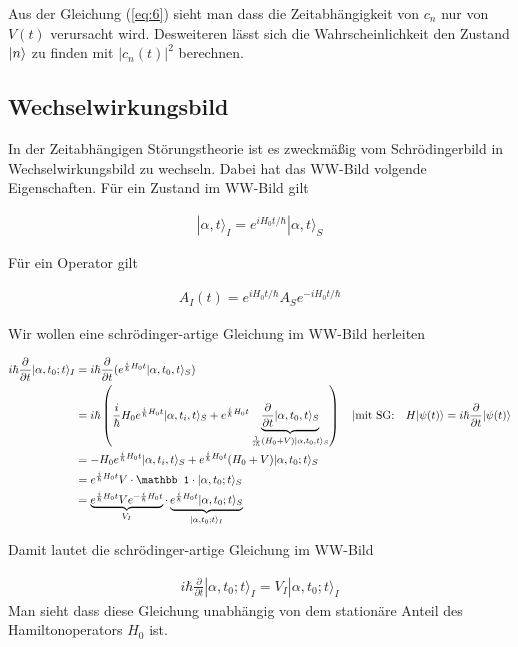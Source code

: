 Aus der Gleichung (\ref{eq:6}) sieht man dass die Zeitabhängigkeit von \(c_n\) nur von \(V(t)\) verursacht wird. Desweiteren lässt sich die Wahrscheinlichkeit den Zustand \(\left| n \right\rangle\) zu finden mit \(|c_n(t)|^2\) berechnen.

\subsection*{Wechselwirkungsbild}

In der Zeitabhängigen Störungstheorie ist es zweckmäßig vom Schrödingerbild in Wechselwirkungsbild zu wechseln. Dabei hat das WW-Bild volgende Eigenschaften. Für ein Zustand im WW-Bild gilt

\begin{align}
  \label{eq:3}
  |\alpha,t\rangle_I = e^{iH_0t/\hbar}|\alpha,t\rangle_S
\end{align}

Für ein Operator gilt

\begin{align}
  \label{eq:4}
   A_I(t) =  e^{iH_0t/\hbar} A_S e^{-iH_0t/\hbar}
\end{align}

Wir wollen eine schrödinger-artige Gleichung im WW-Bild herleiten

\begin{align}
  \label{eq:8}
 i\hbar \frac{\partial}{\partial t}|\alpha,t_0;t\rangle_I &= i\hbar \frac{\partial}{\partial t}(e^{\frac{i}{\hbar}H_0t}|\alpha,t_0,t\rangle_S) \notag\\
&= i\hbar\left(\frac{i}{\hbar}H_0 e^{\frac{i}{\hbar}H_0 t}|\alpha,t_i,t\rangle_S +  e^{\frac{i}{\hbar}H_0t}\underbrace{\frac{\partial}{\partial t}|\alpha,t_0,t\rangle_S}_{\frac{1}{i\hbar}(H_0+V)|\alpha,t_0,t\rangle_S} \right) \quad |\text{mit SG:}\quad H|\psi(t)\rangle=i\hbar \frac{\partial}{\partial t}|\psi(t)\rangle  \notag  \\
&= -H_0 e^{\frac{i}{\hbar}H_0 t}|\alpha,t_i,t\rangle_S + e^{\frac{i}{\hbar}H_0t}(H_0+V)|\alpha,t_0;t\rangle_S \notag \\
&= e^{\frac{i}{\hbar}H_0t}V\cdot\mathbb 1\cdot|\alpha,t_0;t\rangle_S\notag\\
&= \underbrace{e^{\frac{i}{\hbar}H_0t}Ve^{-\frac{i}{\hbar}H_0t}}_{V_I}\cdot \underbrace{e^{\frac{i}{\hbar}H_0t}|\alpha,t_0;t\rangle_S}_{|\alpha,t_0;t\rangle_I}
\end{align}

Damit lautet die schrödinger-artige Gleichung im WW-Bild

\begin{align}
  \label{eq:9}
  \boxed{i\hbar \frac{\partial}{\partial t} |\alpha,t_0;t\rangle_I = V_I|\alpha,t_0;t\rangle_I}
\end{align}
Man sieht dass diese Gleichung unabhängig von dem stationäre Anteil des Hamiltonoperators \(H_0\) ist.

